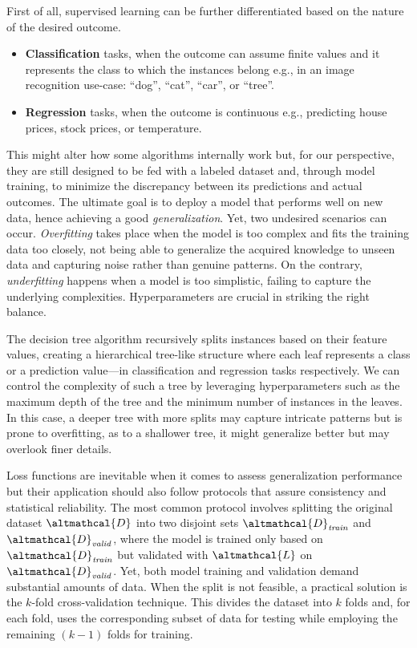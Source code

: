 \documentclass[a4paper,12pt,times,numbered,print,index]{Classes/PhDThesisPSnPDF}
\begin{document}
First of all, supervised learning can be further differentiated based on the nature of the desired outcome.
\begin{itemize}
    \item \textbf{Classification} tasks, when the outcome can assume finite values and it represents the class to which the instances belong e.g., in an image recognition use-case: ``dog'', ``cat'', ``car'', or ``tree''.
    \item \textbf{Regression} tasks, when the outcome is continuous e.g., predicting house prices, stock prices, or temperature.
\end{itemize}
This might alter how some algorithms internally work but, for our perspective, they are still designed to be fed with a labeled dataset and, through model training, to minimize the discrepancy between its predictions and actual outcomes.
The ultimate goal is to deploy a model that performs well on new data, hence achieving a good \textit{generalization}.
Yet, two undesired scenarios can occur.
\textit{Overfitting} takes place when the model is too complex and fits the training data too closely, not being able to generalize the acquired knowledge to unseen data and capturing noise rather than genuine patterns.
On the contrary, \textit{underfitting} happens when a model is too simplistic, failing to capture the underlying complexities.
Hyperparameters are crucial in striking the right balance.

\begin{example}
    The decision tree algorithm recursively splits instances based on their feature values, creating a hierarchical tree-like structure where each leaf represents a class or a prediction value---in classification and regression tasks respectively.
    We can control the complexity of such a tree by leveraging hyperparameters such as the maximum depth of the tree and the minimum number of instances in the leaves.
    In this case, a deeper tree with more splits may capture intricate patterns but is prone to overfitting, as to a shallower tree, it might generalize better but may overlook finer details.
\end{example}

Loss functions are inevitable when it comes to assess generalization performance but their application should also follow protocols that assure consistency and statistical reliability.
The most common protocol involves splitting the original dataset $\altmathcal{D}$ into two disjoint sets $\altmathcal{D}_\mathit{train}$ and $\altmathcal{D}_\mathit{valid}$, where the model is trained only based on $\altmathcal{D}_\mathit{train}$ but validated with $\altmathcal{L}$ on $\altmathcal{D}_\mathit{valid}$.
Yet, both model training and validation demand substantial amounts of data.
When the split is not feasible, a practical solution is the $k$-fold cross-validation technique.
This divides the dataset into $k$ folds and, for each fold, uses the corresponding subset of data for testing while employing the remaining $(k - 1)$ folds for training.
\end{document}
